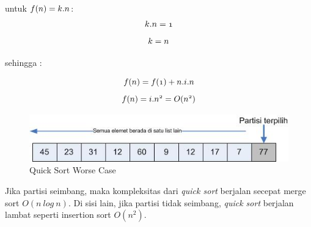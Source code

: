 \documentclass[12pt]{book}%
\begin{document}
untuk $ \mathnormal{f(n) = k.n  }$:
$$ \mathnormal{ k.n = 1  }$$
$$ \mathnormal{ k = n }$$

sehingga :

$$ \mathnormal{f(n) = f(1) + n.i.n} $$
$$ \mathnormal{f(n) = i.n^{2} = O(n^{2})} $$
		

\begin{figure}[htbp]
\begin{center}
	\includegraphics[scale=0.5]{fig/sunario-3/QuickSort3.jpg}%
	\caption{Quick Sort Worse Case}%
	\label{fig:WorseCaseQuickSort}%
\end{center}
\end{figure}


Jika partisi seimbang, maka kompleksitas dari  \textit{quick sort} berjalan secepat merge sort $O(n\ log\ n)$. Di sisi lain, jika partisi tidak seimbang, \textit{quick sort} berjalan lambat seperti insertion sort $O(n^{2})$.
\end{document}
